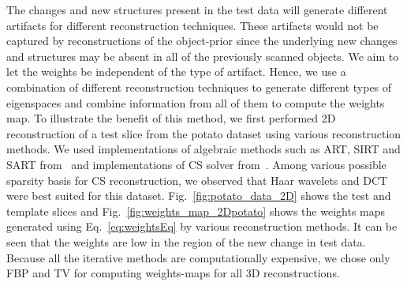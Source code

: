 \documentclass[journal]{IEEEtran}
\begin{document}
The changes and new structures present in the test data will generate
different artifacts for different reconstruction techniques. These
artifacts would not be captured by reconstructions of the object-prior
since the underlying new changes and structures may be absent in all
of the previously scanned objects. We aim to let the weights be
independent of the type of artifact. Hence, we use a combination of
different reconstruction techniques to generate different types of
eigenspaces and combine information from all of them to compute the
weights map. To illustrate the benefit of this method, we first performed
2D reconstruction of a test slice from the potato dataset using
various reconstruction methods. We used implementations of algebraic
methods such as ART, SIRT and SART from~\cite{AIR_tools} and
implementations of CS solver from~\cite{l1ls}. Among various possible
sparsity basis for CS reconstruction, we observed that Haar wavelets
and DCT were best suited for this
dataset. Fig.~\ref{fig:potato_data_2D} shows the test and template
slices and Fig.~\ref{fig:weights_map_2Dpotato} shows the weights maps
generated using Eq.~\ref{eq:weightsEq} by various reconstruction
methods. It can be seen that the weights are low in the region of the
new change in test data. Because all the iterative methods are
computationally expensive, we chose only FBP and TV for computing
weights-maps for all 3D reconstructions.
\end{document}
